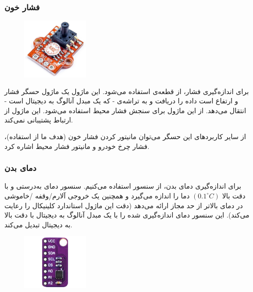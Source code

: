 \documentclass[12pt]{article}
\begin{document}
\subsubsection{فشار خون}

\begin{figure}[h]
	\begin{center}
		\includegraphics[width=0.3\textwidth]{MPS20N0040D}
	\end{center}
	\caption{}
\end{figure}

برای اندازه‌گیری فشار، از قطعه‌ی
استفاده می‌شود. این ماژول یک ماژول حسگر فشار و ارتفاع است داده را دریافت و به تراشه‌ی
- که یک مبدل آنالوگ به دیجیتال است - انتقال می‌دهد. از این ماژول برای سنجش فشار محیط استفاده می‌شود. این ماژول از ارتباط
پشتیبانی نمی‌کند.


از سایر کاربردهای این حسگر می‌توان مانیتور کردن فشار خون (هدف ما از استفاده)، فشار چرخ خودرو و مانیتور فشار محیط اشاره کرد.

\subsubsection{دمای بدن}
برای اندازه‌گیری دمای بدن، از سنسور
استفاده می‌کنیم. سنسور دمای
به‌درستی و با دقت بالا
$(0.1^\circ C)$
دما را اندازه می‌گیرد و همچنین یک خروجی آلارم/وقفه
/خاموشی در دمای بالاتر از حد مجاز ارائه می‌دهد (دقت این ماژول استاندارد کلینیکال
را رعایت می‌کند).
این سنسور دمای اندازه‌گیری شده را با یک مبدل آنالوگ به دیجیتال
با دقت بالا به دیجیتال تبدیل می‌کند.

\begin{figure}[h]
	\begin{center}
		\includegraphics[width=0.3\textwidth]{MAX30205}
	\end{center}
	\caption{}
\end{figure}
\end{document}
